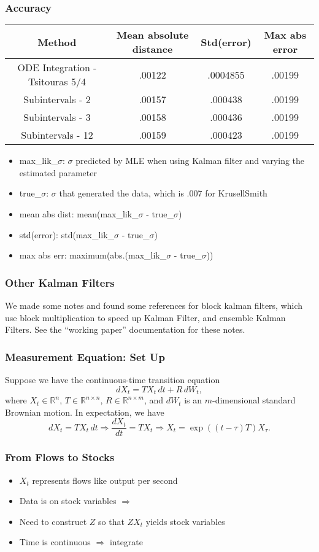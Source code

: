 \documentclass{beamer}
\newcommand{\R}{\mathbb{R}}
\newcommand{\RA}{\Rightarrow}
\begin{document}
\begin{frame}
  \frametitle{Accuracy}
\begin{center}
\begin{tabular}{|c|c|c|c|}
\hline
Method &  Mean absolute distance & Std(error) & Max abs error\\
\hline
ODE Integration - Tsitouras 5/4 & .00122 & .0004855 & .00199\\
Subintervals - 2 &.00157 & .000438 & .00199\\
Subintervals - 3 & .00158 & .000436 & .00199\\
Subintervals - 12 & .00159 & .000423 & .00199\\
\hline
\end{tabular}
\end{center}
\begin{itemize}
\item max\_lik\_$\sigma$: $\sigma$ predicted by MLE when using Kalman filter and varying the estimated parameter
\item true\_$\sigma$: $\sigma$ that generated the data, which is .007 for KrusellSmith
\item mean abs dist: mean(max\_lik\_$\sigma$ - true\_$\sigma$)
\item std(error): std(max\_lik\_$\sigma$ - true\_$\sigma$)\\
\item max abs err: maximum(abs.(max\_lik\_$\sigma$ - true\_$\sigma$))\\
\end{itemize}
\end{frame}


\begin{frame}
  \frametitle{Other Kalman Filters}
We made some notes and found some references for block kalman filters, which use block multiplication to speed up Kalman Filter, and ensemble Kalman Filters. See the ``working paper'' documentation for these notes.
\end{frame}

\begin{frame}
  \frametitle{Measurement Equation: Set Up}
Suppose we have the continuous-time transition equation
\[dX_t = TX_t\,dt + R\, dW_t,  \]
where $X_t\in \R^n$, $T\in \R^{n\times n}$, $R\in \R^{n\times m}$, and $dW_t$ is an $m$-dimensional standard Brownian motion. In expectation, we have
\[ dX_t = TX_t\,dt \RA \dfrac{dX_t}{dt} = TX_t\RA X_t = \exp((t- \tau)T)X_{\tau}. \]
\end{frame}

\begin{frame}
  \frametitle{From Flows to Stocks}
  \begin{itemize}
  \item $X_t$ represents flows like output per second
  \item Data is on stock variables $\RA$
  \item Need to construct $Z$ so that $ZX_t$ yields stock variables
  \item Time is continuous $\RA$ integrate
  \end{itemize}
\end{frame}
\end{document}
